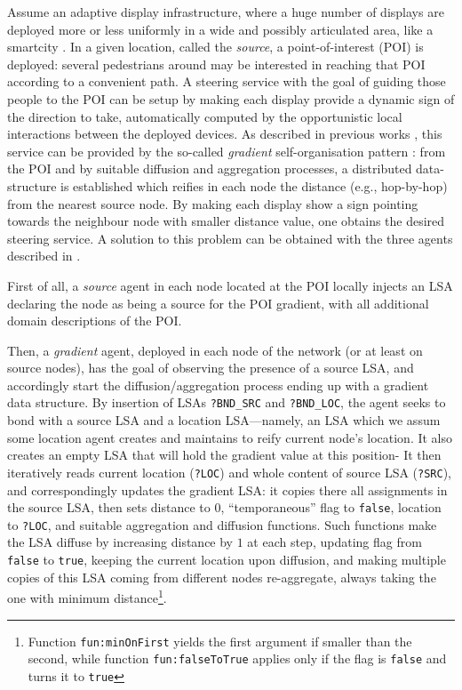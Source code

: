 \documentclass[12pt,a4paper,twoside,openright]{book}
\begin{document}
Assume an adaptive display infrastructure, where a huge number of displays are deployed more or less uniformly in a wide and possibly articulated area, like a smartcity \cite{Montagna-MONET2012}.
%
In a given location, called the \emph{source}, a point-of-interest (POI) is deployed: several pedestrians around may be interested in reaching that POI according to a convenient path.
%
A steering service with the goal of guiding those people to the POI can be setup by making each display provide a dynamic sign of the direction to take, automatically computed by the opportunistic local interactions between the deployed devices.
%
As described in previous works \cite{Montagna-MONET2012,crf,VCMZ-TAAS2011}, this service can be provided by the so-called \emph{gradient} self-organisation pattern \cite{FDMVA-NACO2012}: from the POI and by suitable diffusion and aggregation processes, a distributed data-structure is established which reifies in each node the distance (e.g., hop-by-hop) from the nearest source node. 
%
By making each display show a sign pointing towards the neighbour node with smaller distance value, one obtains the desired steering service.
%
A solution to this problem can be obtained with the three agents described in .


First of all, a \emph{source} agent in each node located at the POI locally injects an LSA declaring the node as being a source for the POI gradient, with all additional domain descriptions of the POI.

Then, a \emph{gradient} agent, deployed in each node of the network (or at least on source nodes), has the goal of observing the presence of a source LSA, and accordingly start the diffusion/aggregation process ending up with a gradient data structure. 
%
By insertion of LSAs \texttt{?BND\_SRC} and \texttt{?BND\_LOC}, the agent seeks to bond with a source LSA and a location LSA---namely, an LSA which we assum some location agent creates and maintains to reify current node's location.
%
It also creates an empty LSA that will hold the gradient value at this position-
%
It then iteratively reads current location (\texttt{?LOC}) and whole content of source LSA (\texttt{?SRC}), and correspondingly updates the gradient LSA: it copies there all assignments in the source LSA, then sets distance to $0$, ``temporaneous'' flag to \texttt{false}, location to \texttt{?LOC}, and suitable aggregation and diffusion functions.
%
Such functions make the LSA diffuse by increasing distance by $1$ at each step, updating flag from \texttt{false} to \texttt{true}, keeping the current location upon diffusion, and making multiple copies of this LSA coming from different nodes re-aggregate, always taking the one with minimum distance\footnote{Function \texttt{fun:minOnFirst} yields the first argument if smaller than the second, while function \texttt{fun:falseToTrue} applies only if the flag is \texttt{false} and turns it to \texttt{true}}.
\end{document}
